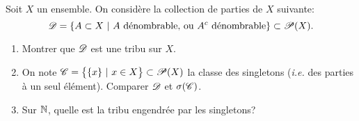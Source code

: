\begin{td-exo}
    Soit \(X\) un ensemble. On considère la collection de parties de \(X\) suivante:
    \[
    \mathscr{D}=\{A\subset X\ |\ A\mbox{ dénombrable, ou }A^c\mbox{ dénombrable}\}\subset\mathscr{P}(X).
    \]
    \begin{enumerate}
        \item  Montrer que \(\mathscr{D}\) est une tribu sur \(X\).
        \item  On note \(\mathscr{C}=\bigl\{\{x\}\ |\ x\in X\bigr\}\subset\mathscr{P}(X)\) la classe des singletons (\textit{i.e.} des parties à un seul élément). Comparer \(\mathscr{D}\) et \(\sigma(\mathscr{C})\).
        \item  Sur \(\mathbb{N}\), quelle est la tribu engendrée par les singletons?
    \end{enumerate}
\end{td-exo}
